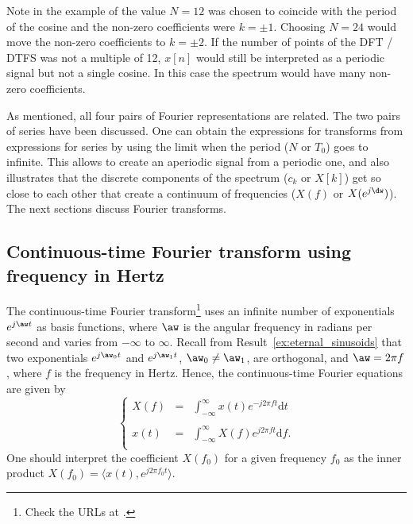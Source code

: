 Note in the example of  the value $N=12$ was chosen to coincide with the period of the cosine and the non-zero coefficients were $k=\pm 1$. Choosing $N=24$ would move the non-zero coefficients to $k=\pm 2$. If the number of points of the DFT / DTFS was not a multiple of 12, $x[n]$ would still be interpreted as a periodic signal but not a single cosine. In this case the spectrum would have many non-zero coefficients. 
\eExample


As mentioned, all four pairs of Fourier representations are related. The two pairs of series have been discussed. One can obtain the expressions for transforms from expressions for series by using the limit when the period ($N$ or $T_0$) goes to infinite. This allows to create an aperiodic signal from a periodic one, and also illustrates that the discrete components of the spectrum ($c_k$ or $X[k]$) get so close to each other that create a continuum of frequencies ($X(f)$ or $X(e^{j\dw})$).
The next sections discuss Fourier transforms.

\subsection{Continuous-time Fourier transform using frequency in Hertz}
\label{sec:ctft_hz}

The continuous-time Fourier transform\footnote{Check the URLs at .} uses an infinite number of exponentials $e^{j \aw t}$ as basis functions, where $\aw$ is the angular frequency in radians per second and varies from $-\infty$ to $\infty$. Recall from Result~\ref{ex:eternal_sinusoids} that two exponentials $e^{j \aw_0 t}$ and $e^{j \aw_1 t}$, $\aw_0 \ne \aw_1$, are orthogonal,
and $\aw=2 \pi f$, where $f$ is the frequency in Hertz.
Hence, the continuous-time Fourier equations are given by
\begin{equation}
\left\{
\begin{array}{ccc}
X(f) & = & \int_{-\infty}^\infty x(t) e^{- j 2 \pi f t} \textrm{d}t \\
& & \\
x(t) & = & \int_{-\infty}^\infty X(f) e^{j 2 \pi f t} \textrm{d}f.
\label{eq:transforms_fourier}
\\ \end{array}
\right.
\end{equation}
One should interpret the coefficient $X(f_0)$ for a given frequency $f_0$ as the inner product $X(f_0) = \langle x(t),e^{j 2 \pi f_0 t}\rangle$.

